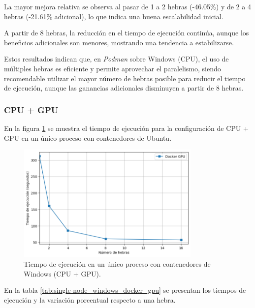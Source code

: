 La mayor mejora relativa se observa al pasar de 1 a 2 hebras (-46.05\%) y de 2 a 4 hebras (-21.61\% adicional), lo que indica una buena escalabilidad inicial.

A partir de 8 hebras, la reducción en el tiempo de ejecución continúa, aunque los beneficios adicionales son menores, mostrando una tendencia a estabilizarse.

Estos resultados indican que, en \textit{Podman} sobre Windows (CPU), el uso de múltiples hebras es eficiente y permite aprovechar el paralelismo, siendo recomendable utilizar el mayor número de hebras posible para reducir el tiempo de ejecución, aunque las ganancias adicionales disminuyen a partir de 8 hebras.

\subsubsection{CPU + GPU}

En la figura \ref{fig:single-node_windows_docker_gpu_time} se muestra el tiempo de ejecución para la configuración de CPU + GPU en un único proceso con contenedores de Ubuntu.

\begin{figure}[ht]
    \centering
    \includegraphics[width=0.8\textwidth]{imagenes/cap5/single-node_ubuntu_docker_gpu_time.png}
    \caption{Tiempo de ejecución en un único proceso con contenedores de Windows (CPU + GPU).}
    \label{fig:single-node_windows_docker_gpu_time}
\end{figure}

En la tabla \ref{tab:single-node_windows_docker_gpu} se presentan los tiempos de ejecución y la variación porcentual respecto a una hebra.

